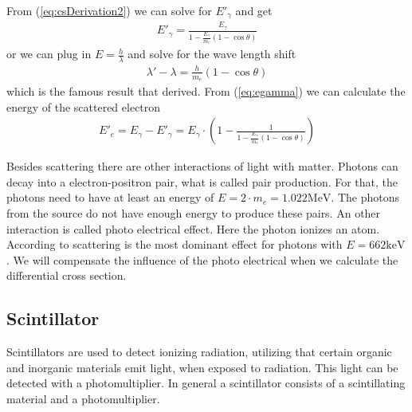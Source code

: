 From (\ref{eq:csDerivation2}) we can solve for $E'_\gamma$ and get
\begin{align}
  E'_\gamma = \frac{E_\gamma}{1 - \frac{E_\gamma}{m_e} (1-\cos \theta)} 
  \label{eq:egamma}
\end{align}
or we can plug in $E = \frac{h}{\lambda}$ and solve for the wave length shift
\begin{align}
  \lambda' - \lambda = \frac{h}{m_e} (1- \cos \theta)
\end{align}
which is the famous result that \compton derived. From (\ref{eq:egamma}) we
can calculate the energy of the scattered electron
\begin{align}
  E'_e = E_\gamma - E'_\gamma = E_\gamma \cdot \left( 1- \frac{1}{1 -
  \frac{E_\gamma}{m_e} (1-\cos \theta)}\right)
  \label{eq:eelectron}
\end{align} 

Besides \compton scattering there are other interactions of light with
matter. Photons can decay into a electron-positron pair, what is called pair
production. For that, the photons need to have at least an energy of $E=2\cdot
m_e=1.022\mathrm{MeV}$. The photons from the \Cs source do not have enough
energy to produce these pairs. An other interaction is called
photo electrical effect. Here the photon ionizes an atom. According to
\cite{dem4} \compton scattering is the most dominant effect for photons with
$E=662\mathrm{keV}$. We will compensate the influence of the photo electrical
when we calculate the differential cross section.

\subsection{Scintillator}
Scintillators are used to detect ionizing radiation, utilizing that certain organic
and inorganic materials emit light, when exposed to radiation.
This light can be detected with a photomultiplier. In general a scintillator
consists of a scintillating material and a photomultiplier.


